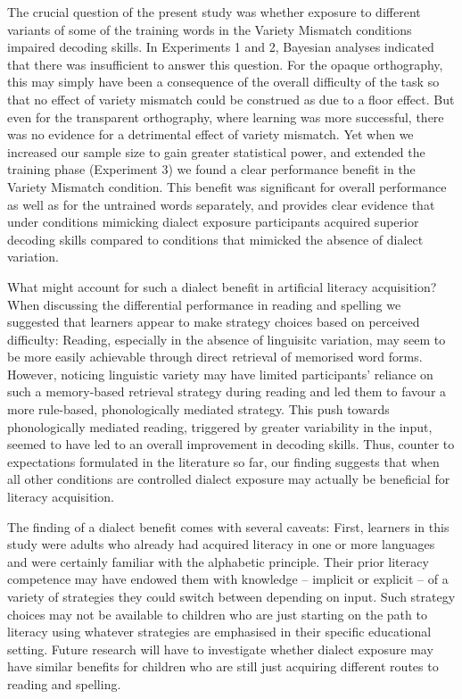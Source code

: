 \documentclass[doc,floatsintext]{apa6}
\begin{document}
The crucial question of the present study was whether exposure to
different variants of some of the training words in the Variety Mismatch
conditions impaired decoding skills. In Experiments 1 and 2, Bayesian
analyses indicated that there was insufficient to answer this question.
For the opaque orthography, this may simply have been a consequence of
the overall difficulty of the task so that no effect of variety mismatch
could be construed as due to a floor effect. But even for the
transparent orthography, where learning was more successful, there was
no evidence for a detrimental effect of variety mismatch. Yet when we
increased our sample size to gain greater statistical power, and
extended the training phase (Experiment 3) we found a clear performance
benefit in the Variety Mismatch condition. This benefit was significant
for overall performance as well as for the untrained words separately,
and provides clear evidence that under conditions mimicking dialect
exposure participants acquired superior decoding skills compared to
conditions that mimicked the absence of dialect variation.

What might account for such a dialect benefit in artificial literacy
acquisition? When discussing the differential performance in reading and
spelling we suggested that learners appear to make strategy choices
based on perceived difficulty: Reading, especially in the absence of
linguisitc variation, may seem to be more easily achievable through
direct retrieval of memorised word forms. However, noticing linguistic
variety may have limited participants' reliance on such a memory-based
retrieval strategy during reading and led them to favour a more
rule-based, phonologically mediated strategy. This push towards
phonologically mediated reading, triggered by greater variability in the
input, seemed to have led to an overall improvement in decoding skills.
Thus, counter to expectations formulated in the literature so far, our
finding suggests that when all other conditions are controlled dialect
exposure may actually be beneficial for literacy acquisition.

The finding of a dialect benefit comes with several caveats: First,
learners in this study were adults who already had acquired literacy in
one or more languages and were certainly familiar with the alphabetic
principle. Their prior literacy competence may have endowed them with
knowledge -- implicit or explicit -- of a variety of strategies they
could switch between depending on input. Such strategy choices may not
be available to children who are just starting on the path to literacy
using whatever strategies are emphasised in their specific educational
setting. Future research will have to investigate whether dialect
exposure may have similar benefits for children who are still just
acquiring different routes to reading and spelling.
\end{document}

